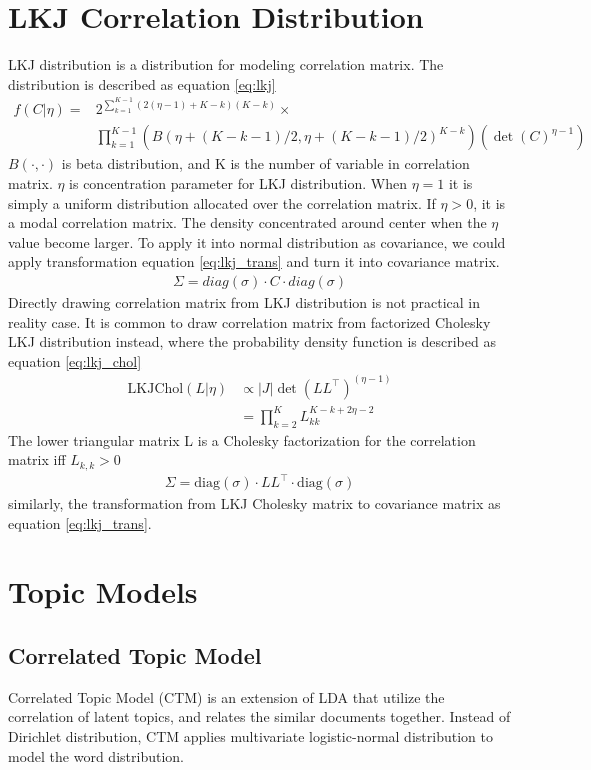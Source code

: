\section{LKJ Correlation Distribution} \label{ch2:lkj}
LKJ distribution \cite{lewandowski_generating_2009} is a distribution for modeling correlation matrix. The distribution is described as equation \ref{eq:lkj}
\begin{align} \label{eq:lkj}
f(C|\eta)=&2^{\sum_{k=1}^{K-1}(2(\eta-1)+K-k)(K-k)}\times\\
&\prod_{k=1}^{K-1}(B(\eta+(K-k-1)/2,\eta+(K-k-1)/2)^{K-k})(\det(C)^{\eta-1})
\end{align}
$ B(\cdot,\cdot) $ is beta distribution, and K is the number of variable in correlation matrix. $ \eta $ is concentration parameter for LKJ distribution. When $ \eta=1 $ it is simply a uniform distribution allocated over the correlation matrix. If $ \eta>0 $, it is a modal correlation matrix. The density concentrated around center when the $ \eta $ value become larger.
To apply it into normal distribution as covariance, we could apply transformation equation \ref{eq:lkj_trans} and turn it into covariance matrix\cite{barnard_modeling_2000}.
\begin{align}\label{eq:lkj_trans}
\Sigma=diag(\sigma)\cdot C \cdot diag(\sigma)
\end{align}
Directly drawing correlation matrix from LKJ distribution is not practical in reality case. It is common to draw correlation matrix from factorized Cholesky LKJ distribution instead, where the probability density function is described as equation \ref{eq:lkj_chol}
\begin{align} \label{eq:lkj_chol}
\text{LKJChol}(L|\eta)&\propto|J|\det(LL^\top)^{(\eta-1)}\\
&=\prod_{k=2}^{K}L_{kk}^{K-k+2\eta-2}
\end{align}
The lower triangular matrix L is a Cholesky factorization for the correlation matrix iff $ L_{k,k}>0 $
\begin{align}
\Sigma=\text{diag}(\sigma)\cdot LL^\top \cdot \text{diag}(\sigma)
\end{align}
similarly, the transformation from LKJ Cholesky matrix to covariance matrix as equation \ref{eq:lkj_trans}.
\section{Topic Models}
\subsection{Correlated Topic Model} \label{ch2:ctm}
Correlated Topic Model (CTM)\cite{blei_correlated_2007} is an extension of LDA\cite{blei_latent_2003} that utilize the correlation of latent topics, and relates the similar documents together. Instead of Dirichlet distribution, CTM applies multivariate logistic-normal distribution to model the word distribution.

